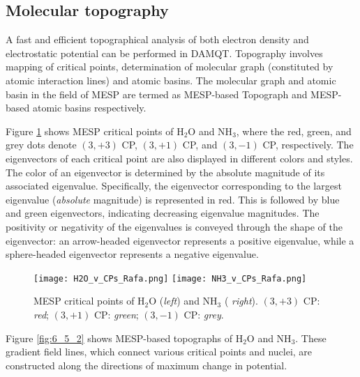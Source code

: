 \documentclass[10pt]{article}
\begin{document}

\subsection{Molecular topography \label{sec:6.5} }

A fast and efficient topographical analysis of both electron density and electrostatic potential can be 
performed in DAMQT. Topography involves mapping of critical points, determination of 
molecular graph (constituted by atomic interaction lines) and atomic basins. The 
molecular graph and atomic basin in the field of MESP are termed as 
MESP-based Topograph and MESP-based atomic basins respectively.

Figure \ref{fig:6_5_1} shows MESP critical points of H$_2$O and NH$_3$, where the red, green, and grey dots 
denote $(3,+3)$ CP, $(3,+1)$ CP, and $(3,-1)$ CP, respectively. The eigenvectors of each critical point are also
displayed in different colors and styles. The color of an eigenvector is determined by the absolute magnitude 
of its associated eigenvalue. Specifically, the eigenvector corresponding to the largest eigenvalue 
({\it absolute} magnitude) is represented in red. This is followed by blue and green eigenvectors, indicating 
decreasing eigenvalue magnitudes. The positivity or negativity of the eigenvalues is conveyed through the 
shape of the eigenvector: an arrow-headed eigenvector represents a positive eigenvalue, while a 
sphere-headed eigenvector represents a negative eigenvalue.
  

\begin{figure}[H]
\begin{center}
\vspace*{-3mm}
\texttt{[image: H2O\_v\_CPs\_Rafa.png]}
\hspace*{5mm}
\texttt{[image: NH3\_v\_CPs\_Rafa.png]}
\end{center}
\caption[MESP critical points of H$_2$O and NH$_3$]{MESP critical points of H$_2$O ({\it left}) and NH$_3$ ({\it
right}). $(3,+3)$ CP: {\it red}; $(3,+1)$ CP: {\it green}; $(3,-1)$ CP: {\it grey}.
\label{fig:6_5_1}}
\end{figure}

Figure \ref{fig:6_5_2} shows MESP-based topographs of H$_2$O and NH$_3$. These gradient field lines, which connect various critical points and nuclei, are constructed along the directions of maximum change in potential.
\end{document}
